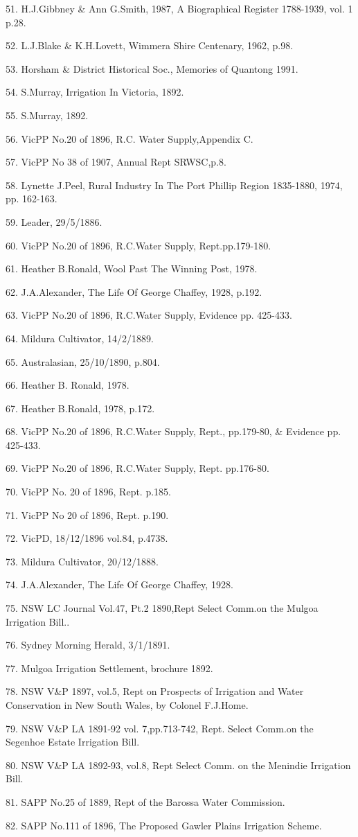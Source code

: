 51. H.J.Gibbney \& Ann G.Smith, 1987, A Biographical Register 1788-1939, vol. 1
      p.28.

52. L.J.Blake \& K.H.Lovett, Wimmera Shire Centenary, 1962, p.98.

53. Horsham \& District Historical Soc., Memories of Quantong 1991.

54. S.Murray, Irrigation In Victoria, 1892.

55. S.Murray, 1892.

56. VicPP No.20 of 1896, R.C. Water Supply,Appendix C.

57. VicPP No 38 of 1907, Annual Rept SRWSC,p.8.

58. Lynette J.Peel, Rural Industry In The Port Phillip Region 1835-1880, 1974,
      pp. 162-163.

59. Leader, 29/5/1886.

60. VicPP No.20 of 1896, R.C.Water Supply, Rept.pp.179-180.

61. Heather B.Ronald, Wool Past The Winning Post, 1978.

62. J.A.Alexander, The Life Of George Chaffey, 1928, p.192.

63. VicPP No.20 of 1896, R.C.Water Supply, Evidence pp. 425-433.

64. Mildura Cultivator, 14/2/1889.

65. Australasian, 25/10/1890, p.804.

66. Heather B. Ronald, 1978.

67. Heather B.Ronald, 1978, p.172.

68. VicPP No.20 of 1896, R.C.Water Supply, Rept., pp.179-80, \& 
      Evidence pp. 425-433.

69. VicPP No.20 of 1896, R.C.Water Supply, Rept. pp.176-80.

70. VicPP No. 20 of 1896, Rept. p.185.

71. VicPP No 20 of 1896, Rept. p.190.

72. VicPD, 18/12/1896 vol.84, p.4738.

73. Mildura Cultivator, 20/12/1888.

74. J.A.Alexander, The Life Of George Chaffey, 1928.

75. NSW LC Journal Vol.47, Pt.2 1890,Rept Select Comm.on the Mulgoa Irrigation
      Bill..

76. Sydney Morning Herald, 3/1/1891.

77. Mulgoa Irrigation Settlement, brochure 1892.

78. NSW V\&P 1897, vol.5, Rept on Prospects of Irrigation and Water Conservation
      in New South Wales, by Colonel F.J.Home.

79. NSW V\&P LA 1891-92 vol. 7,pp.713-742, Rept. Select Comm.on the
      Segenhoe Estate Irrigation Bill.

80. NSW V\&P LA 1892-93, vol.8, Rept Select Comm. on the Menindie
      Irrigation Bill.

81. SAPP No.25 of 1889, Rept of the Barossa Water Commission.

82. SAPP No.111 of 1896, The Proposed Gawler Plains Irrigation Scheme.
